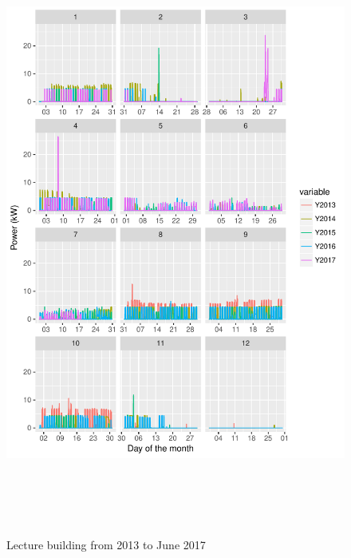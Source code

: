 \documentclass[11pt, oneside]{article}   	%
\begin{document}
\clearpage
\begin{figure}
\includegraphics[width=30cm,height=20cm,keepaspectratio]{lecture_build.pdf}
\caption{Lecture building from  2013 to June 2017}
\end{figure}
\end{document}

